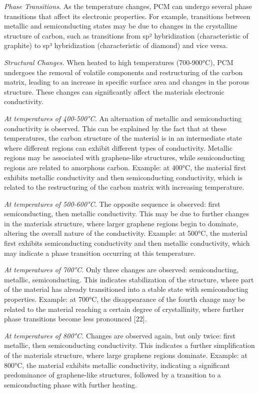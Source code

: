 \begin{multicols}{2}
\emph{Phase Transitions.} As the temperature changes, PCM can undergo
several phase transitions that affect its electronic properties. For
example, transitions between metallic and semiconducting states may be
due to changes in the crystalline structure of carbon, such as
transitions from sp² hybridization (characteristic of graphite) to sp³
hybridization (characteristic of diamond) and vice versa.

\emph{Structural Changes.} When heated to high temperatures (700-900°C),
PCM undergoes the removal of volatile components and restructuring of
the carbon matrix, leading to an increase in specific surface area and
changes in the porous structure. These changes can significantly affect
the material\textquotesingle s electronic conductivity.

\emph{At temperatures of 400-500°C.} An alternation of metallic and
semiconducting conductivity is observed. This can be explained by the
fact that at these temperatures, the carbon structure of the material is
in an intermediate state where different regions can exhibit different
types of conductivity. Metallic regions may be associated with
graphene-like structures, while semiconducting regions are related to
amorphous carbon. Example: at 400°C, the material first exhibits
metallic conductivity and then semiconducting conductivity, which is
related to the restructuring of the carbon matrix with increasing
temperature.

\emph{At temperatures of 500-600°C.} The opposite sequence is observed:
first semiconducting, then metallic conductivity. This may be due to
further changes in the material\textquotesingle s structure, where
larger graphene regions begin to dominate, altering the overall nature
of the conductivity. Example: at 500°C, the material first exhibits
semiconducting conductivity and then metallic conductivity, which may
indicate a phase transition occurring at this temperature.

\emph{At temperatures of 700°C.} Only three changes are observed:
semiconducting, metallic, semiconducting. This indicates stabilization
of the structure, where part of the material has already transitioned
into a stable state with semiconducting properties. Example: at 700°C,
the disappearance of the fourth change may be related to the material
reaching a certain degree of crystallinity, where further phase
transitions become less pronounced {[}22{]}.

\emph{At temperatures of 800°C.} Changes are observed again, but only
twice: first metallic, then semiconducting conductivity. This indicates
a further simplification of the material\textquotesingle s structure,
where large graphene regions dominate. Example: at 800°C, the material
exhibits metallic conductivity, indicating a significant predominance of
graphene-like structures, followed by a transition to a semiconducting
phase with further heating.


\end{multicols}
